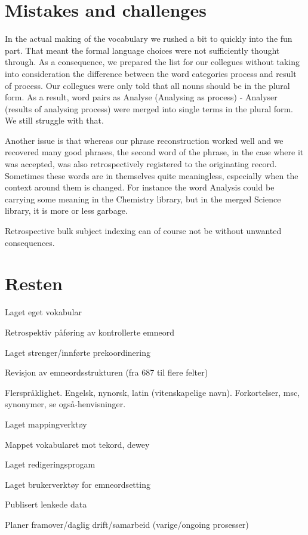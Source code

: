 \section{Mistakes and challenges}
In the actual making of the vocabulary we rushed a bit to quickly into the fun part. That meant the formal language choices were not sufficiently thought through. As a consequence, we prepared the list for our collegues without taking into consideration the difference between the word categories process and result of process. Our collegues were only told that all nouns should be in the plural form. As a result, word pairs as Analyse (Analysing as process) - Analyser (results of analysing process) were merged into single terms in the plural form. We still struggle with that. 

Another issue is that whereas our phrase reconstruction worked well and we recovered many good phrases, the second word of the phrase, in the case where it was accepted, was also retrospectively registered to the originating record. Sometimes these words are in themselves quite meaningless, especially when the context around them is changed. For instance the word Analysis could be carrying some meaning in the Chemistry library, but in the merged Science library, it is more or less garbage. 

Retrospective bulk subject indexing can of course not be without unwanted consequences.  


\section{Resten}

Laget eget vokabular

Retrospektiv påføring av kontrollerte emneord

Laget strenger/innførte prekoordinering



Revisjon av emneordsstrukturen (fra 687 til flere felter)

Flerspråklighet. Engelsk, nynorsk, latin (vitenskapelige navn). Forkortelser, msc, 
synonymer, se også-henvisninger. 

Laget mappingverktøy

Mappet vokabularet mot tekord, dewey

Laget redigeringsprogam 

Laget brukerverktøy for emneordsetting

Publisert lenkede data

Planer framover/daglig drift/samarbeid (varige/ongoing prosesser)
